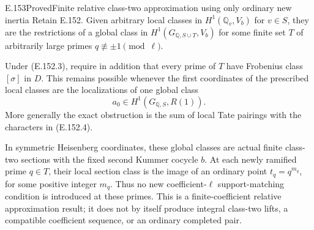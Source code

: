 \begin{result}{E.153}{Proved}{Finite relative class-two approximation using only ordinary new inertia}
Retain E.152. Given arbitrary local classes in
\(H^1(\mathbb Q_v,V_b)\) for \(v\in S\), they are the
restrictions of a global class in
\(H^1(G_{\mathbb Q,S\cup T},V_b)\) for some finite set
\(T\) of arbitrarily large primes
\(q\not\equiv\pm1\pmod\ell\).

Under (E.152.3), require in addition that every prime of \(T\)
have Frobenius class \([\sigma]\) in \(D\). This remains
possible whenever the first coordinates of the prescribed local
classes are the localizations of one global class
\[
                       a_0\in H^1(G_{\mathbb Q,S},R(1)).
 \tag{E.153.1}
\]
More generally the exact obstruction is the sum of local Tate
pairings with the characters in (E.152.4).

In symmetric Heisenberg coordinates, these global classes are
actual finite class-two sections with the fixed second Kummer
cocycle \(b\). At each newly ramified prime \(q\in T\), their
local section class is the image of an ordinary point
\(t_q=q^{m_q}\), for some positive integer \(m_q\).
Thus no new coefficient-\(\ell\) support-matching condition is
introduced at these primes. This is a finite-coefficient relative
approximation result; it does not by itself produce integral
class-two lifts, a compatible coefficient sequence, or an ordinary
completed pair.
\end{result}
